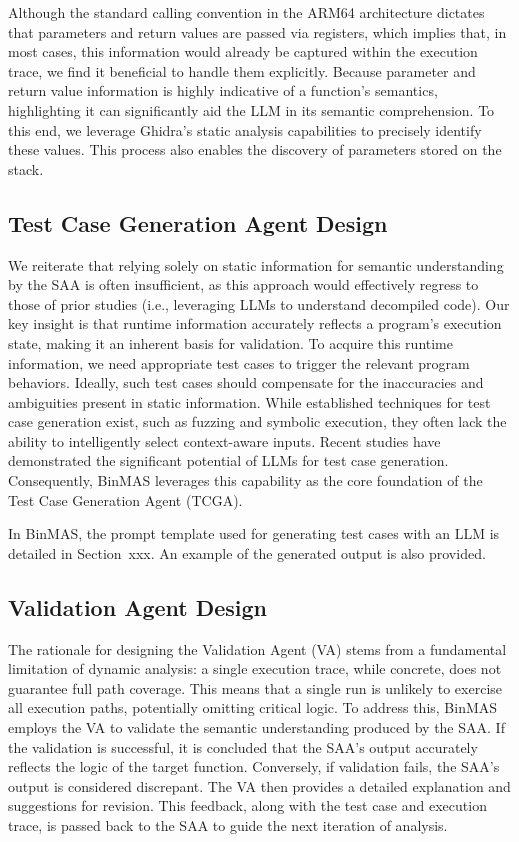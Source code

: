 \documentclass[acmsmall,screen,review,anonymous]{acmart} %
\begin{document}
Although the standard calling convention in the ARM64 architecture dictates that parameters and return values are passed via registers, which implies that, in most cases, this information would already be captured within the execution trace, we find it beneficial to handle them explicitly. Because parameter and return value information is highly indicative of a function's semantics, highlighting it can significantly aid the LLM in its semantic comprehension. To this end, we leverage Ghidra's static analysis capabilities to precisely identify these values. This process also enables the discovery of parameters stored on the stack.



\subsection{Test Case Generation Agent Design}

We reiterate that relying solely on static information for semantic understanding by the SAA is often insufficient, as this approach would effectively regress to those of prior studies (i.e., leveraging LLMs to understand decompiled code). Our key insight is that runtime information accurately reflects a program's execution state, making it an inherent basis for validation. To acquire this runtime information, we need appropriate test cases to trigger the relevant program behaviors. Ideally, such test cases should compensate for the inaccuracies and ambiguities present in static information. While established techniques for test case generation exist, such as fuzzing and symbolic execution, they often lack the ability to intelligently select context-aware inputs. Recent studies have demonstrated the significant potential of LLMs for test case generation. Consequently, BinMAS leverages this capability as the core foundation of the Test Case Generation Agent (TCGA).

In BinMAS, the prompt template used for generating test cases with an LLM is detailed in Section~xxx. An example of the generated output is also provided.

\subsection{Validation Agent Design}

The rationale for designing the Validation Agent (VA) stems from a fundamental limitation of dynamic analysis: a single execution trace, while concrete, does not guarantee full path coverage. This means that a single run is unlikely to exercise all execution paths, potentially omitting critical logic. To address this, BinMAS employs the VA to validate the semantic understanding produced by the SAA. If the validation is successful, it is concluded that the SAA's output accurately reflects the logic of the target function. Conversely, if validation fails, the SAA's output is considered discrepant. The VA then provides a detailed explanation and suggestions for revision. This feedback, along with the test case and execution trace, is passed back to the SAA to guide the next iteration of analysis.
\end{document}
